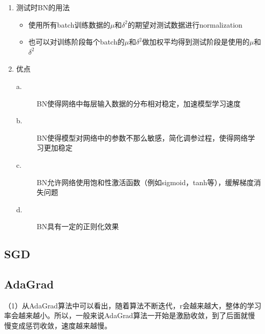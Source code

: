 \documentclass[UTF8]{article}%
\begin{document}
\begin{enumerate}
\begin{itemize}
\begin{description}
						\end{description}
					\end{itemize}
				\item 测试时BN的用法
				\begin{itemize}
					\item 使用所有batch训练数据的$\mu$和$\delta^2$的期望对测试数据进行normalization
					\item 也可以对训练阶段每个batch的$\mu$和$\delta^2$做加权平均得到测试阶段是使用的$\mu$和$\delta^2$
				\end{itemize}
				\item 优点
				\begin{description}
					\item[a.] BN使得网络中每层输入数据的分布相对稳定，加速模型学习速度
					\item[b.] BN使得模型对网络中的参数不那么敏感，简化调参过程，使得网络学习更加稳定
					\item[c.] BN允许网络使用饱和性激活函数（例如sigmoid，tanh等），缓解梯度消失问题
					\item[d.] BN具有一定的正则化效果
				\end{description}
			\end{enumerate}
		\subsection{SGD}
		
		\subsection{AdaGrad}
		（1）从AdaGrad算法中可以看出，随着算法不断迭代，r会越来越大，整体的学习率会越来越小。所以，一般来说AdaGrad算法一开始是激励收敛，到了后面就慢慢变成惩罚收敛，速度越来越慢。

	\newpage
\end{document}
